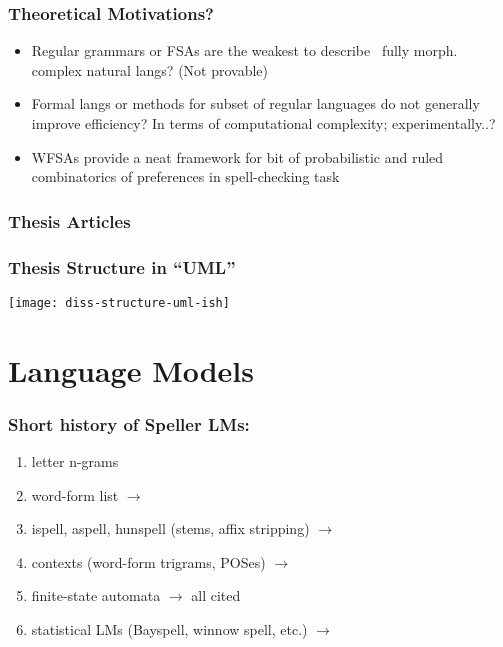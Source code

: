 \documentclass[t,12pt]{beamer}
\begin{document}
\begin{frame}
    \frametitle{Theoretical Motivations?}
    \begin{itemize}
        \item Regular grammars or FSAs are the weakest to describe ~fully
            morph. complex natural langs? (Not provable)
        \item Formal langs or methods for subset of regular languages do not
            generally improve efficiency? In terms of computational complexity;
            experimentally..?
        \item WFSAs provide a neat framework for bit of probabilistic and ruled
            combinatorics of preferences in spell-checking task
    \end{itemize}
\end{frame}


\begin{frame}[allowframebreaks]
  \frametitle{Thesis Articles}
  \begin{small}
      
      
    \end{small}
\end{frame}

\begin{frame}
  \frametitle{Thesis Structure in ``UML''}
  \centering
  \texttt{[image: diss-structure-uml-ish]}
\end{frame}

\section{Language Models}

\begin{frame}
    \frametitle{Short history of Speller LMs:}
    \begin{enumerate}
        \item letter n-grams
        \item word-form list $\rightarrow$ \cite{pirinen2012effects}
        \item ispell, aspell, hunspell (stems, affix stripping)
            $\rightarrow$ \cite{pirinen2010building,pirinen2010creating}

        \item contexts (word-form trigrams, POSes) $\rightarrow$
            \cite{pirinen2012improving}
        \item finite-state automata $\rightarrow$ all cited
        \item statistical LMs (Bayspell, winnow spell, etc.)
            $\rightarrow$ \cite{pirinen2010finitestate}
    \end{enumerate}
\end{frame}
\end{document}
